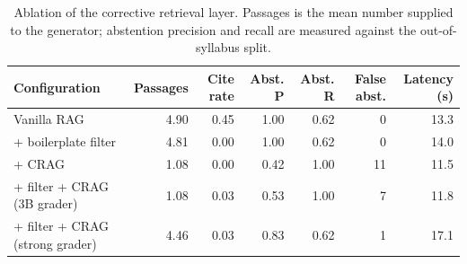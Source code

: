 \begin{table}[htbp]
\caption{Ablation of the corrective retrieval layer. Passages is the mean number supplied to the generator; abstention precision and recall are measured against the out-of-syllabus split.}
\label{tab:ablation}
\begin{tabular}{lrrrrrr}
\toprule
Configuration & Passages & Cite rate & Abst. P & Abst. R & False abst. & Latency (s) \\
\midrule
Vanilla RAG & 4.90 & 0.45 & 1.00 & 0.62 & 0 & 13.3 \\
+ boilerplate filter & 4.81 & 0.00 & 1.00 & 0.62 & 0 & 14.0 \\
+ CRAG & 1.08 & 0.00 & 0.42 & 1.00 & 11 & 11.5 \\
+ filter + CRAG (3B grader) & 1.08 & 0.03 & 0.53 & 1.00 & 7 & 11.8 \\
+ filter + CRAG (strong grader) & 4.46 & 0.03 & 0.83 & 0.62 & 1 & 17.1 \\
\bottomrule
\end{tabular}
\end{table}
